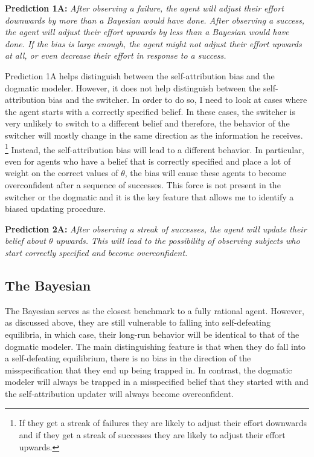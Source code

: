 \documentclass[
  12pt,
]{article}
\begin{document}
\textbf{Prediction 1A:} \emph{After observing a failure, the agent will
adjust their effort downwards by more than a Bayesian would have done.
After observing a success, the agent will adjust their effort upwards by
less than a Bayesian would have done. If the bias is large enough, the
agent might not adjust their effort upwards at all, or even decrease
their effort in response to a success.}

Prediction 1A helps distinguish between the self-attribution bias and
the dogmatic modeler. However, it does not help distinguish between the
self-attribution bias and the switcher. In order to do so, I need to
look at cases where the agent starts with a correctly specified belief.
In these cases, the switcher is very unlikely to switch to a different
belief and therefore, the behavior of the switcher will mostly change in
the same direction as the information he receives.
\footnote{If they get a streak of failures they are likely to 
adjust their effort downwards and if they get a streak of successes they are likely to adjust their effort upwards.}
Instead, the self-attribution bias will lead to a different behavior. In
particular, even for agents who have a belief that is correctly
specified and place a lot of weight on the correct values of \(\theta\),
the bias will cause these agents to become overconfident after a
sequence of successes. This force is not present in the switcher or the
dogmatic and it is the key feature that allows me to identify a biased
updating procedure.

\textbf{Prediction 2A:} \emph{After observing a streak of successes, the
agent will update their belief about \(\theta\) upwards. This will lead
to the possibility of observing subjects who start correctly specified
and become overconfident.}

\hypertarget{the-bayesian-1}{%
\subsection{The Bayesian}\label{the-bayesian-1}}

The Bayesian serves as the closest benchmark to a fully rational agent.
However, as discussed above, they are still vulnerable to falling into
self-defeating equilibria, in which case, their long-run behavior will
be identical to that of the dogmatic modeler. The main distinguishing
feature is that when they do fall into a self-defeating equilibrium,
there is no bias in the direction of the misspecification that they end
up being trapped in. In contrast, the dogmatic modeler will always be
trapped in a misspecified belief that they started with and the
self-attribution updater will always become overconfident.
\end{document}
